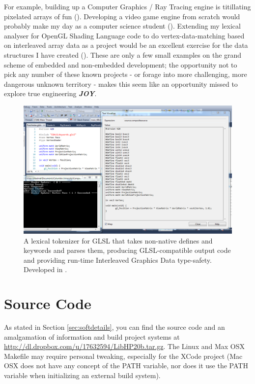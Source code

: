 \documentclass{LibHP20b}
\begin{document}
For example, building up a Computer Graphics / Ray Tracing engine is titillating pixelated arrays of fun (). Developing a video game engine from scratch would probably make my day as a computer science student (). Extending my lexical analyser for OpenGL Shading Language code to do vertex-data-matching based on interleaved array data as a project would be an excellent exercise for the data structures I have created (). These are only a few small examples on the grand scheme of embedded and non-embedded development; the opportunity not to pick any number of these known projects - or forage into more challenging, more dangerous unknown territory - makes this seem like an opportunity missed to explore true engineering \emph{\textbf{JOY}}.\\

\begin{figure}
  \centering
  \includegraphics[width=\textwidth]{GLSLShaderLexicalTokenizer.png}
  \caption{A lexical tokenizer for GLSL that takes non-native defines and keywords and parses them, producing GLSL-compatible output code and providing run-time Interleaved Graphics Data type-safety. Developed in .}
  \label{fig:lexicalsoffun}
\end{figure}

\section{Source Code}
\label{sec:srccode}
As stated in Section \ref{sec:softdetails}, you can find the source code and an amalgamation of information and build project systems at \url{http://dl.dropbox.com/u/17632594/LibHP20b.tar.gz}. The Linux and Max OSX Makefile may require personal tweaking, especially for the XCode project (Mac OSX does not have any concept of the PATH variable, nor does it use the PATH variable when initializing an external build system).\\


\end{document}
